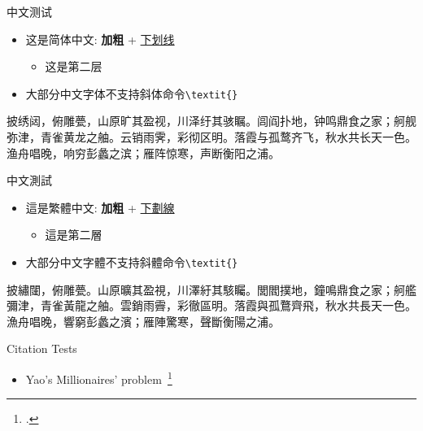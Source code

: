 \begin{frame}{中文测试}
	\begin{itemize}
		\item 这是简体中文: \textbf{加粗} + \underline{下划线}
      \begin{itemize}
        \item 这是第二层
      \end{itemize}
      \item 大部分中文字体不支持斜体命令\texttt{\textbackslash textit\{\}}
	\end{itemize}
  \hfill \break
  披绣闼，俯雕甍，山原旷其盈视，川泽纡其骇瞩。闾阎扑地，钟鸣鼎食之家；舸舰弥津，青雀黄龙之舳。云销雨霁，彩彻区明。落霞与孤鹜齐飞，秋水共长天一色。渔舟唱晚，响穷彭蠡之滨；雁阵惊寒，声断衡阳之浦。
\end{frame}

\begin{frame}{中文測試}
  \begin{itemize}
		\item 這是繁體中文: \textbf{加粗} + \underline{下劃線}
      \begin{itemize}
        \item 這是第二層
      \end{itemize}
    \item 大部分中文字體不支持斜體命令\texttt{\textbackslash textit\{\}}
	\end{itemize}
  \hfill \break
  披繡闥，俯雕甍。山原曠其盈視，川澤紆其駭矚。閭閻撲地，鐘鳴鼎食之家；舸艦彌津，青雀黃龍之舳。雲銷雨霽，彩徹區明。落霞與孤鶩齊飛，秋水共長天一色。漁舟唱晚，響窮彭蠡之濱；雁陣驚寒，聲斷衡陽之浦。
\end{frame}

\begin{frame}{Citation Tests}
	\begin{itemize}
		\item Yao's Millionaires' problem~\footcite{10.5555/1382436.1382751}
	\end{itemize}
\end{frame}

